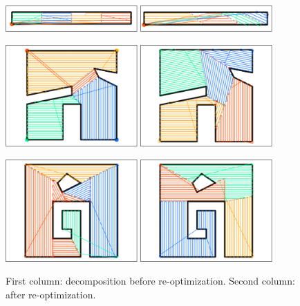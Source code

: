 \documentclass[../main.tex]{subfiles}
\begin{document}
\begin{figure}
		\centering
		\includegraphics[width=0.45\textwidth]{img/chapter_5/ID_1_orig.pdf}%
		\includegraphics[width=0.45\textwidth]{img/chapter_5/ID_1_reopt.pdf}

		\includegraphics[width=0.45\textwidth]{img/chapter_5/ID_2_orig.pdf}%
		\includegraphics[width=0.45\textwidth]{img/chapter_5/ID_2_reopt_BETTER.pdf}

		\includegraphics[width=0.45\textwidth]{img/chapter_5/ID_3_orig_BETTER.pdf}%
		\includegraphics[width=0.45\textwidth]{img/chapter_5/ID_3_reopt_BETTER.pdf}

	\caption{First column: decomposition before re-optimization. Second column: after re-optimization.}
	\label{fig:decomposition_results}
\end{figure}
\end{document}

